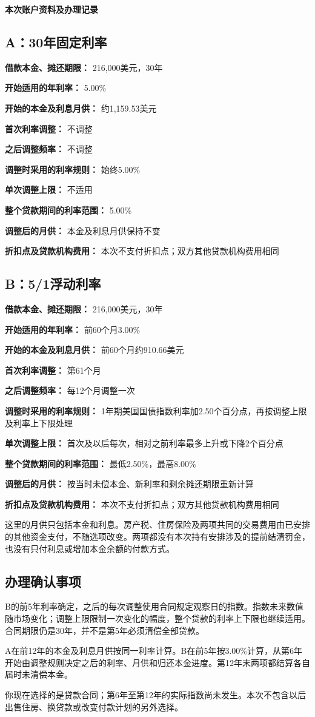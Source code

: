 \documentclass[UTF8,fontset=none,11pt,a4paper]{ctexart}
\begin{document}
{\noindent\fontsize{20}{25}\selectfont\bfseries 本次账户资料及办理记录\par}
\vspace{10pt}
\subsection*{A：30年固定利率}
\textbf{借款本金、摊还期限：} 216,000美元，30年


\textbf{开始适用的年利率：} 5.00\%


\textbf{开始的本金及利息月供：} 约1,159.53美元


\textbf{首次利率调整：} 不调整


\textbf{之后调整频率：} 不调整


\textbf{调整时采用的利率规则：} 始终5.00\%


\textbf{单次调整上限：} 不适用


\textbf{整个贷款期间的利率范围：} 5.00\%


\textbf{调整后的月供：} 本金及利息月供保持不变


\textbf{折扣点及贷款机构费用：} 本次不支付折扣点；双方其他贷款机构费用相同


\subsection*{B：5/1浮动利率}
\textbf{借款本金、摊还期限：} 216,000美元，30年


\textbf{开始适用的年利率：} 前60个月3.00\%


\textbf{开始的本金及利息月供：} 前60个月约910.66美元


\textbf{首次利率调整：} 第61个月


\textbf{之后调整频率：} 每12个月调整一次


\textbf{调整时采用的利率规则：} 1年期美国国债指数利率加2.50个百分点，再按调整上限及利率上下限处理


\textbf{单次调整上限：} 首次及以后每次，相对之前利率最多上升或下降2个百分点


\textbf{整个贷款期间的利率范围：} 最低2.50\%，最高8.00\%


\textbf{调整后的月供：} 按当时未偿本金、新利率和剩余摊还期限重新计算


\textbf{折扣点及贷款机构费用：} 本次不支付折扣点；双方其他贷款机构费用相同


这里的月供只包括本金和利息。房产税、住房保险及两项共同的交易费用由已安排的其他资金支付，不随选项改变。两项都没有本次持有安排涉及的提前结清罚金，也没有只付利息或增加本金余额的付款方式。


\subsection*{办理确认事项}
B的前5年利率确定，之后的每次调整使用合同规定观察日的指数。指数未来数值随市场变化；调整上限限制一次变化的幅度，整个贷款的利率上下限也继续适用。合同期限仍是30年，并不是第5年必须清偿全部贷款。


A在前12年的本金及利息月供按同一利率计算。B在前5年按3.00\%计算，从第6年开始由调整规则决定之后的利率、月供和归还本金进度。第12年末两项都结算各自届时未清偿本金。


你现在选择的是贷款合同；第6年至第12年的实际指数尚未发生。本次不包含以后出售住房、换贷款或改变付款计划的另外选择。
\end{document}
